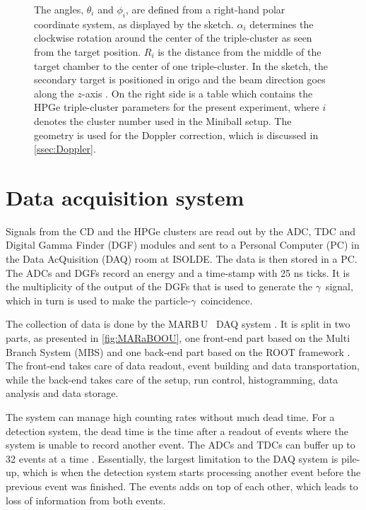 \documentclass[twoside,english]{uiofysmaster/uiofysmaster}
\newcommand{\ga}{$\gamma$}
\newcommand{\MBOU}{MAR\belowbaseline[-2pt]{a}B\stackinset{l}{3pt}{b}{-3pt}{O}{O}\,U}
\let\orgautoref\autoref
\renewcommand{\autoref}
        {%
		 \def\sectionautorefname{Section}%
		 \def\subsectionautorefname{Section}%
		 \def\subsubsectionautorefname{Section}%
		 \def\chapterautorefname{Chapter}%
          \orgautoref}
\begin{document}
\begin{figure}[htb!]
{	The angles, $\theta_i$ and $\phi_i$, are defined from a right-hand polar coordinate system, as displayed by the sketch.
	$\alpha_i$ determines the clockwise rotation around the center of the triple-cluster as seen from the target position.
	$R_i$ is the distance from the middle of the target chamber to the center of one triple-cluster.
	In the sketch, the secondary target is positioned in origo and the beam direction goes along the $z$-axis \cite{NWarr-Angles, Rosiak}. 
	On the right side is a table which contains the HPGe triple-cluster parameters for the present experiment, where $i$ denotes the cluster number used in the Miniball setup. 
	The geometry is used for the Doppler correction, which is discussed in \autoref{ssec:Doppler}.}
	\label{fig:HPGe}
\end{figure}


\section{Data acquisition system}\label{sec:DAQ}
Signals from the CD and the HPGe clusters are read out by the ADC, TDC and Digital Gamma Finder (DGF) modules and sent to a Personal Computer (PC) in the Data AcQuisition (DAQ) room at ISOLDE. 
The data is then stored in a PC. 
The ADCs and DGFs record an energy and a time-stamp with 25 ns ticks. 
It is the multiplicity of the output of the DGFs that is used to generate the \ga\ signal, which in turn is used to make the particle-\ga\ coincidence.

The collection of data is done by the \MBOU\ \cite{Maraboou, Maraboou-web} DAQ system \cite{MB-spect}. 
It is split in two parts, as presented in \autoref{fig:MARaBOOU}, one front-end part based on the Multi Branch System (MBS) \cite{MBS} and one back-end part based on the ROOT framework \cite{ROOT}.
The front-end takes care of data readout, event building and data transportation, while the back-end takes care of the setup, run control, histogramming, data analysis and data storage. 

The system can manage high counting rates without much dead time. 
For a detection system, the dead time is the time after a readout of events where the system is unable to record another event. 
The ADCs and TDCs can buffer up to 32 events at a time \cite{MB-spect}. 
Essentially, the largest limitation to the DAQ system is pile-up, which is when the detection system starts processing another event before the previous event was finished. 
The events adds on top of each other, which leads to loss of information from both events.
\end{document}
